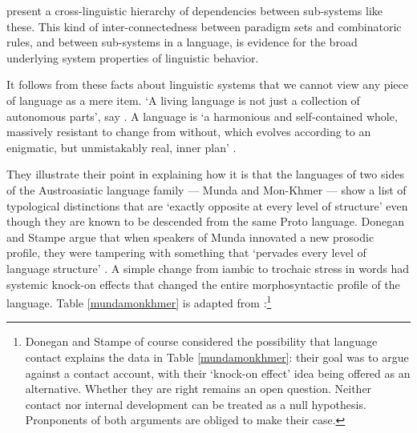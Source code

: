 \citet{aikhenvald_dependencies_1998} present a cross-linguistic hierarchy of dependencies between sub-systems like these. This kind of inter-connectedness between 
paradigm sets and combinatoric rules, and between sub-systems in a 
language, is evidence for the broad underlying system properties of 
linguistic behavior. 



It follows from these facts about linguistic systems that we cannot 
view any piece of language as a mere item. \textquoteleft A living language is not 
just a collection of autonomous parts', say \citet[1]{donegan_rhythm_1983}. A language is \textquoteleft a harmonious and self-contained whole, massively 
resistant to change from without, which evolves according to an 
enigmatic, but unmistakably real, inner plan' \citep[1]{donegan_rhythm_1983}. 



They illustrate their point in explaining how it is that the languages 
of two sides of the Austroasiatic language family --- Munda and 
Mon-Khmer --- show a list of typological distinctions that are \textquoteleft exactly 
opposite at every level of structure' \citep[111]{donegan_south-east_2002} 
even though they are known to be descended from the same Proto language. Donegan and Stampe argue that when speakers of Munda innovated a new prosodic profile, they 
were tampering with something that \textquoteleft pervades every level of language 
structure' \citep[14]{donegan_rhythm_1983}. A simple change from iambic to trochaic stress in words had systemic knock-on effects that changed the entire morphosyntactic profile of the language. Table \ref{mundamonkhmer}
is adapted from \citet[1-2]{donegan_rhythm_1983}:\footnote{Donegan and Stampe of course considered the possibility that language contact explains the data in Table \ref{mundamonkhmer}: their goal was to argue against a contact account, with their `knock-on effect' idea being offered as an alternative. Whether they are right remains an open question. Neither contact nor internal development can be treated as a null hypothesis. Pronponents of both arguments are obliged to make their case.}


